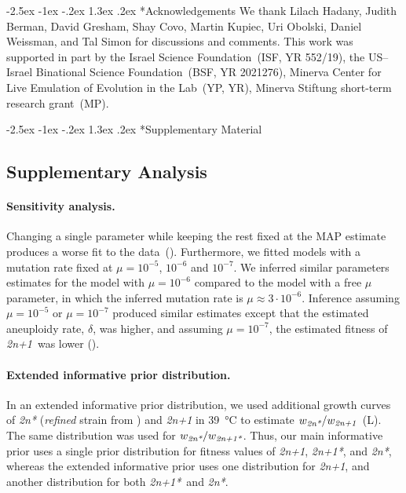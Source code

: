 \documentclass[12pt]{extarticle}
\makeatletter
\renewcommand\section{\@startsection {section}{1}{\z@}%
     {-2.5ex \@plus -1ex \@minus -.2ex}%
     {1.3ex \@plus.2ex}%
    {\Large\bfseries}}
\newcommand{\anwt}{\emph{2n+1}}
\newcommand{\eumt}{\emph{2n*}}
\newcommand{\anmt}{\emph{2n+1*}}
\newcommand{\beginsupplement}{%
      	\setcounter{table}{0}
        \renewcommand{\thetable}{S\arabic{table}}%
        \setcounter{figure}{0}
        \renewcommand{\thefigure}{S\arabic{figure}}%
}
\makeatother
\begin{document}

{\small
\section*{Acknowledgements}
We thank Lilach Hadany, Judith Berman, David Gresham, Shay Covo, Martin Kupiec, Uri Obolski, Daniel Weissman, and Tal Simon for discussions and comments.
This work was supported in part by 
the Israel Science Foundation~(ISF, YR 552/19),
the US--Israel Binational Science Foundation~(BSF, YR 2021276),
Minerva Center for Live Emulation of Evolution in the Lab~(YP, YR),
Minerva Stiftung short-term research grant~(MP).
}




\newpage

\section*{Supplementary Material}
\beginsupplement %

\subsection*{Supplementary Analysis}
\label{sec:supp_analysis}

\paragraph{Sensitivity analysis.} 
Changing a single parameter while keeping the rest fixed at the MAP estimate produces a worse fit to the data~().
Furthermore, we fitted models with a mutation rate fixed at $\mu=10^{-5}$, $10^{-6}$ and $10^{-7}$.
We inferred similar parameters estimates for the model with $\mu=10^{-6}$ compared to the model with a free $\mu$ parameter, in which the inferred mutation rate is $\mu \approx 3\cdot10^{-6}$.
Inference assuming $\mu=10^{-5}$ or $\mu=10^{-7}$ produced similar estimates except that the estimated aneuploidy rate, $\delta$, was higher, and assuming $\mu=10^{-7}$, the estimated fitness of \anwt\ was lower ().

\paragraph{Extended informative prior distribution.}
In an extended informative prior distribution, we used additional growth curves of \eumt\; (\emph{refined} strain from \citet{Yona2012}) and \anwt\; in \SI{39}{\celsius} to estimate $w_{\eumt}/w_{\anwt}$~(L). The same distribution was used for $w_{\eumt}/w_{\anmt}$. 
Thus, our main informative prior uses a single prior distribution for fitness values of \anwt, \anmt, and \eumt, whereas the extended informative prior uses one distribution for \anwt, and another distribution for both \anmt\ and \eumt. 
\end{document}
